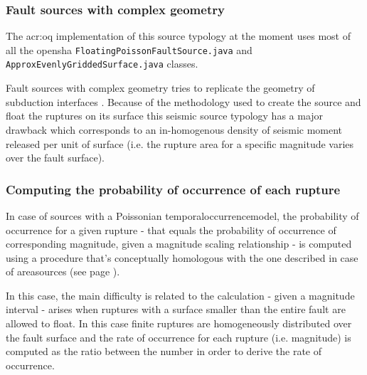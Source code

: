 \subsubsection{Fault sources with complex geometry}
%
The \gls{acr:oq} implementation of this source typology at the moment 
uses most of all the \gls{opensha} \texttt{FloatingPoissonFaultSource.java}
and \texttt{ApproxEvenlyGriddedSurface.java} classes.

Fault sources with complex geometry tries to replicate the geometry of
subduction interfaces \citep{hayes2009,heuret2011}.
Because of the methodology used to create the source and float the 
ruptures on its surface this seismic source typology has a major 
drawback which corresponds to an in-homogenous density of seismic 
moment released per unit of surface (i.e. the rupture area for a specific
magnitude varies over the fault surface).
%
\subsubsection{Computing the probability of occurrence of each rupture}
In case of sources with a Poissonian \gls{temporaloccurrencemodel}, the 
probability of occurrence for a given rupture - that equals the probability
of occurrence of corresponding magnitude, given a magnitude scaling
relationship - is computed using a procedure that's conceptually 
homologous with the one described in case of \glspl{areasource} (see
page \pageref{par:erf_calc_area_src}). 

In this case, the main difficulty is related to the calculation - given a 
magnitude interval - arises when ruptures with a surface smaller than the 
entire fault are allowed to float. In this case finite ruptures are 
homogeneously distributed over the fault surface and the rate of occurrence
for each rupture (i.e. magnitude) is computed as the ratio between the number 
in order to derive the 
rate of occurrence. 
